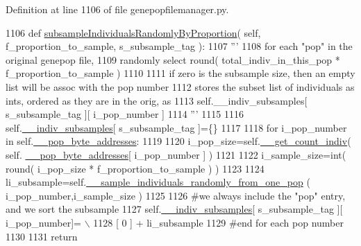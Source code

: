 Definition at line 1106 of file genepopfilemanager.\+py.


\begin{DoxyCode}
1106     \textcolor{keyword}{def }\hyperlink{classnegui_1_1genepopfilemanager_1_1GenepopFileManager_a5c85ac4838fd6919be1c408bcd39f54e}{subsampleIndividualsRandomlyByProportion}( self, 
      f\_proportion\_to\_sample, s\_subsample\_tag ):
1107         \textcolor{stringliteral}{'''}
1108 \textcolor{stringliteral}{        for each "pop" in the original genepop file,}
1109 \textcolor{stringliteral}{        randomly select round( total\_indiv\_in\_this\_pop * f\_proportion\_to\_sample )}
1110 \textcolor{stringliteral}{        }
1111 \textcolor{stringliteral}{        if zero is the subsample size, then an empty list will be assoc with the pop number}
1112 \textcolor{stringliteral}{        stores the subset list of individuals as ints, ordered as they are in the orig, as      }
1113 \textcolor{stringliteral}{        self.\_\_indiv\_subsamples[ s\_subsample\_tag ][ i\_pop\_number ]}
1114 \textcolor{stringliteral}{        '''}
1115 
1116         self.\hyperlink{classnegui_1_1genepopfilemanager_1_1GenepopFileManager_a1e8379bcee4902ca9314ff53fcb71644}{\_\_indiv\_subsamples}[ s\_subsample\_tag ]=\{\}
1117 
1118         \textcolor{keywordflow}{for} i\_pop\_number \textcolor{keywordflow}{in} self.\hyperlink{classnegui_1_1genepopfilemanager_1_1GenepopFileManager_ae24c2bdd19136a345bdb42fd49c5d91f}{\_\_pop\_byte\_addresses}:
1119 
1120             i\_pop\_size=self.\hyperlink{classnegui_1_1genepopfilemanager_1_1GenepopFileManager_ac7cc98fe56efee82b4ffd4dc816a4704}{\_\_get\_count\_indiv}( self.
      \hyperlink{classnegui_1_1genepopfilemanager_1_1GenepopFileManager_ae24c2bdd19136a345bdb42fd49c5d91f}{\_\_pop\_byte\_addresses}[ i\_pop\_number ] )
1121 
1122             i\_sample\_size=int( round( i\_pop\_size * f\_proportion\_to\_sample ) )
1123 
1124             li\_subsample=self.\hyperlink{classnegui_1_1genepopfilemanager_1_1GenepopFileManager_a9818467c9cb40f8e1de0c6cc7f52e263}{\_\_sample\_individuals\_randomly\_from\_one\_pop}
      ( i\_pop\_number,i\_sample\_size )
1125 
1126             \textcolor{comment}{#we always include the "pop" entry, and we sort the subsample}
1127             self.\hyperlink{classnegui_1_1genepopfilemanager_1_1GenepopFileManager_a1e8379bcee4902ca9314ff53fcb71644}{\_\_indiv\_subsamples}[ s\_subsample\_tag ][ i\_pop\_number]= \(\backslash\)
1128                      [ 0 ] +  li\_subsample
1129         \textcolor{comment}{#end for each pop number}
1130 
1131         \textcolor{keywordflow}{return}
\end{DoxyCode}
